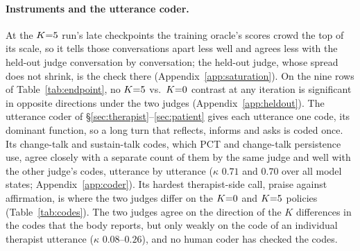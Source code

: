 \paragraph{Instruments and the utterance coder.}
At the $K{=}5$ run's late checkpoints the training oracle's scores crowd the top of its scale, so it
tells those conversations apart less well and agrees less with the held-out judge conversation by
conversation; the held-out judge, whose spread does not shrink, is the check there
(Appendix~\ref{app:saturation}). On the nine rows of Table~\ref{tab:endpoint}, no $K{=}5$ vs.\ $K{=}0$
contrast at any iteration is significant in opposite directions under the two judges
(Appendix~\ref{app:heldout}).
The utterance coder of \S\ref{sec:therapist}--\ref{sec:patient} gives each utterance one code,
its dominant function, so a long turn that reflects, informs and asks is coded once. Its
change-talk and sustain-talk codes, which PCT and change-talk persistence use, agree closely with a
separate count of them by the same judge and well with the other judge's codes, utterance by
utterance ($\kappa$ $0.71$ and $0.70$ over all model states; Appendix~\ref{app:coder}). Its hardest therapist-side call, praise against affirmation, is where
the two judges differ on the $K{=}0$ and $K{=}5$ policies (Table~\ref{tab:codes}). The two judges agree on the
direction of the $K$ differences in the codes that the body reports, but only weakly on the code of an
individual therapist utterance ($\kappa$ $0.08$--$0.26$), and no human coder has checked the codes.
